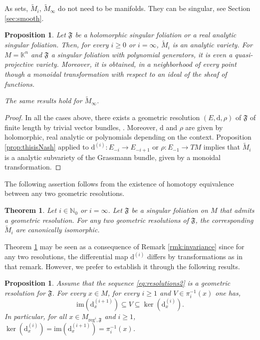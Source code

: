 \documentclass[10pt]{article}
\theoremstyle{plain}
\newtheorem{theorem}[lemma]{Theorem}
\newtheorem{proposition}[lemma]{Proposition}
\theoremstyle{definition}
\theoremstyle{remark}
\newcommand{\dd}{\mathrm{d}}
\begin{document}
As sets, $\widetilde M_i$, $\widetilde M_\infty$ do not need to be manifolds. They can be singular, see Section  \ref{sec:smooth}. 
\begin{proposition}\label{prop:locally-aff}
 Let $\mathfrak F$ be a holomorphic singular foliation or a  real analytic singular foliation. 
 Then, for every  $i\geq 0$ or $i=\infty$, $\widetilde M_i$ is an analytic variety.
 For $ M=\mathbb K^n$ and $ \mathfrak F$ a singular foliation with polynomial generators, it is even a quasi-projective variety. 
Moreover, it is obtained, in a neighborhood of every point though a monoidal transformation with respect to an ideal of the sheaf of functions.
 
The same results hold for $\widetilde M_\infty$.
\end{proposition}
\begin{proof}
In all the cases above, there exists a geometric resolution $(E, \dd, \rho)$ of $\mathfrak{F}$ of finite length by trivial vector bundles, \cite{LLS}. Moreover, $\dd$ and $\rho$ are given by holomorphic, real analytic or polynomials depending on the context. Proposition \ref{prop:thisisNash} applied to $\dd^{(i)}\colon E_{-i}\to E_{-i+1}$ or $\rho\colon E_{-1}\to TM$ implies that $\widetilde M_i$ is  a analytic subvariety of the Grassmann bundle, given by a monoidal transformation.
\end{proof}


The following assertion follows from the existence of homotopy equivalence between any two geometric resolutions.

\begin{theorem}\label{thm:independence}
Let $i\in \mathbb N_0$ or $i=\infty$.  Let $\mathfrak F$ be a singular foliation on $M$ that admits a geometric resolution. For any two geometric resolutions of $\mathfrak{F}$, the corresponding   $\widetilde M_i$ are canonically isomorphic. %
\end{theorem}

Theorem \ref{thm:independence} may be seen as a consequence of Remark \ref{rmk:invariance} since for any two resolutions, the differential map $\dd^{(i)} $ differs by transformations as in that remark. However, we prefer to establish it through the following results.

\begin{proposition}\label{thm:Transformation} Assume that the sequence \eqref{eq:resolutions2} is a geometric resolution for $\mathfrak F$. For every $x\in M$, for every $i\geq 1$ and $V\in \pi^{-1}_i(x)$ one has, \begin{equation}
     \mathrm{im}(\dd^{(i+1)}_{x})\subseteq V \subseteq \ker(\dd^{(i)}_x).
 \end{equation}{In particular, for all $x\in M_{\mathrm{reg}^{i}, \mathfrak  F}$ and $i\geq 1$,\;  $\ker(\dd^{(i)}_x)=\mathrm{im}(\dd^{(i+1)}_x)=\pi_i^{-1}(x)$}.%
 \end{proposition}
\end{document}
